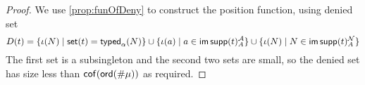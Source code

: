 \begin{proof}
  We use \cref{prop:funOfDeny} to construct the position function, using denied set
  \[ D(t) = \{ \iota(N) \mid \operatorname{\mathsf{set}}(t) = \operatorname{\mathsf{typed}}_\alpha(N) \} \cup \{ \iota(a) \mid a \in \operatorname{\mathsf{im}} \operatorname{\mathsf{supp}}(t)_A^{\mathcal A} \} \cup \{ \iota(N) \mid N \in \operatorname{\mathsf{im}} \operatorname{\mathsf{supp}}(t)_A^{\mathcal N} \} \]
  The first set is a subsingleton and the second two sets are small, so the denied set has size less than \( \operatorname{\mathsf{cof}}(\operatorname{\mathsf{ord}}(\#\mu)) \) as required.
\end{proof}
